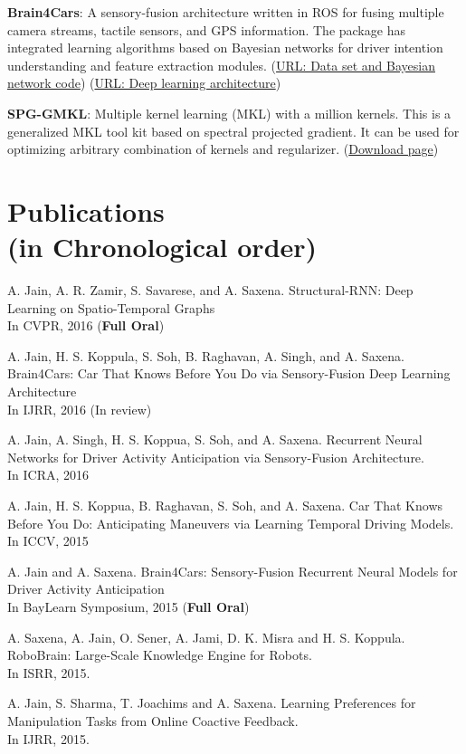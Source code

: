 \documentclass[line,margin]{res}
\begin{document}
\begin{resume}
 \textbf{Brain4Cars}: A sensory-fusion architecture written in ROS for fusing
 multiple camera streams, tactile sensors, and GPS information. The package has
 integrated learning algorithms based on Bayesian networks for driver intention
 understanding and feature extraction modules.
 (\href{https://github.com/asheshjain399/ICCV2015_Brain4Cars}{URL: Data set and
 Bayesian network code}) (\href{https://github.com/asheshjain399/RNNexp}{URL: Deep
 learning architecture})

\textbf{SPG-GMKL}: Multiple kernel learning (MKL) with a million kernels. This is a generalized MKL tool kit based on spectral projected gradient. It can be used for optimizing arbitrary combination of kernels and regularizer. (\href{http://www.cs.cornell.edu/~ashesh/pubs/code/SPG-GMKL/download.html}{Download page})  
 \section{Publications\\ (in Chronological order)} 

 		A. Jain, A. R. Zamir, S. Savarese, and A. Saxena.
Structural-RNN: Deep Learning on Spatio-Temporal Graphs\\In CVPR, 2016 (\textbf{Full Oral}) 

  		A. Jain, H. S. Koppula, S. Soh, B. Raghavan, A. Singh, and A. Saxena.
Brain4Cars: Car That Knows Before You Do via Sensory-Fusion Deep Learning Architecture\\In IJRR, 2016 (In review) 

		A. Jain, A. Singh, H. S. Koppua, S. Soh, and A. Saxena.
Recurrent Neural Networks for Driver Activity Anticipation via Sensory-Fusion Architecture.\\ In ICRA, 2016
 
		A. Jain, H. S. Koppua, B. Raghavan, S. Soh, and A. Saxena.
Car That Knows Before You Do: Anticipating Maneuvers via Learning Temporal Driving Models.\\In ICCV, 2015 


		A. Jain and A. Saxena. Brain4Cars: Sensory-Fusion Recurrent Neural Models for Driver Activity Anticipation\\
In BayLearn Symposium, 2015 (\textbf{Full Oral}) 
 
  		A. Saxena, A. Jain, O. Sener, A. Jami, D. K. Misra and H. S. Koppula.
RoboBrain: Large-Scale Knowledge Engine for Robots.\\In ISRR, 2015.

  		A. Jain, S. Sharma, T. Joachims and  A. Saxena. Learning Preferences for
Manipulation Tasks from Online Coactive Feedback.\\In IJRR, 2015.
 

\end{resume}
\end{document}
